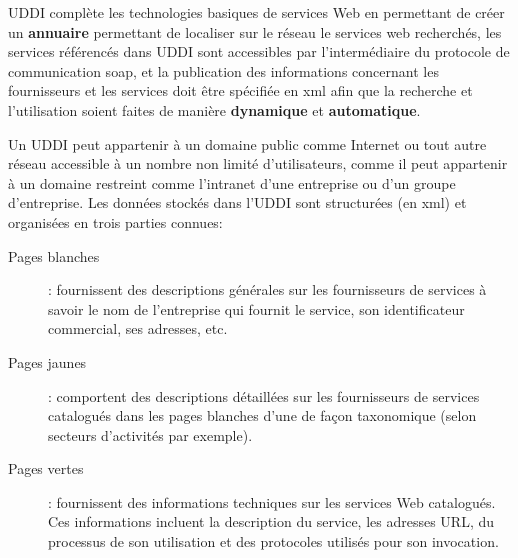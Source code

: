   \textsc{UDDI} complète les technologies basiques de services Web en
  permettant de créer un \textbf{annuaire} permettant de localiser sur
  le réseau le services web recherchés, les services référencés dans
  \textsc{UDDI} sont accessibles par l'intermédiaire du protocole de
  communication \acrshort{soap}, et la publication des informations
  concernant les fournisseurs et les services doit être spécifiée en
  \acrshort{xml} afin que la recherche et l'utilisation soient faites de
  manière \textbf{dynamique} et \textbf{automatique}.\medskip

  Un \textsc{UDDI} peut appartenir à un domaine public comme Internet
  ou tout autre réseau accessible à un nombre non limité
  d'utilisateurs, comme il peut appartenir à un domaine restreint
  comme l'intranet d'une entreprise ou d'un groupe d'entreprise. Les
  données stockés dans l'\textsc{UDDI} sont structurées (en
  \acrshort{xml}) et organisées en trois parties connues:

  \SpecialItem
  \renewcommand{\descriptionlabel}[1]{\hspace{0.5cm}\texttt{#1}}
  \begin{description}
    \item[Pages blanches]: fournissent des descriptions générales sur
      les fournisseurs de services à savoir le nom de l'entreprise qui
      fournit le service, son identificateur commercial, ses adresses,
      etc.

    \item[Pages jaunes]: comportent des descriptions détaillées sur
      les fournisseurs de services catalogués dans les pages blanches
      d'une de façon taxonomique (selon secteurs d'activités par
      exemple).

    \item[Pages vertes]: fournissent des informations techniques sur
      les services Web catalogués. Ces informations incluent la
      description du service, les adresses \textsc{URL}, du processus
      de son utilisation et des protocoles utilisés pour son
      invocation.
  \end{description}

